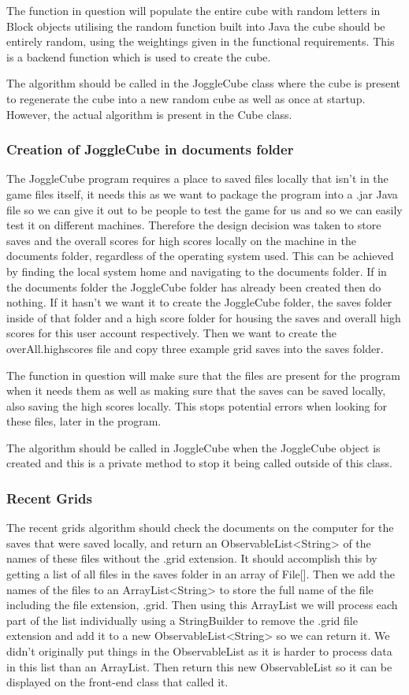     The function in question will populate the entire cube with random letters in Block objects utilising the random function built into Java the cube should be entirely random, using the weightings given in the functional requirements. This is a backend function which is used to create the cube.
    
    The algorithm should be called in the JoggleCube class where the cube is present to regenerate the cube into a new random cube as well as once at startup. However, the actual algorithm is present in the Cube class.
    \subsubsection{Creation of JoggleCube in documents folder}
    The JoggleCube program requires a place to saved files locally that isn't in the game files itself, it needs this as we want to package the program into a .jar Java file so we can give it out to be people to test the game for us and so we can easily test it on different machines. Therefore the design decision was taken to store saves and the overall scores for high scores locally on the machine in the documents folder, regardless of the operating system used. This can be achieved by finding the local system home and navigating to the documents folder. If in the documents folder the JoggleCube folder has already been created then do nothing. If it hasn't we want it to create the JoggleCube folder, the saves folder inside of that folder and a high score folder for housing the saves and overall high scores for this user account respectively. Then we want to create the overAll.highscores file and copy three example grid saves into the saves folder.
    
    The function in question will make sure that the files are present for the program when it needs them as well as making sure that the saves can be saved locally, also saving the high scores locally. This stops potential errors when looking for these files, later in the program.
    
    The algorithm should be called in JoggleCube when the JoggleCube object is created and this is a private method to stop it being called outside of this class.
    \subsubsection{Recent Grids}
    The recent grids algorithm should check the documents on the computer for the saves that were saved locally, and return an ObservableList<String> of the names of these files without the .grid extension. It should accomplish this by getting a list of all files in the saves folder in an array of File[]. Then we add the names of the files to an ArrayList<String> to store the full name of the file including the file extension, .grid. Then using this ArrayList we will process each part of the list individually using a StringBuilder to remove the .grid file extension and add it to a new ObservableList<String> so we can return it. We didn't originally put things in the ObservableList as it is harder to process data in this list than an ArrayList. Then return this new ObservableList so it can be displayed on the front-end class that called it.
    
